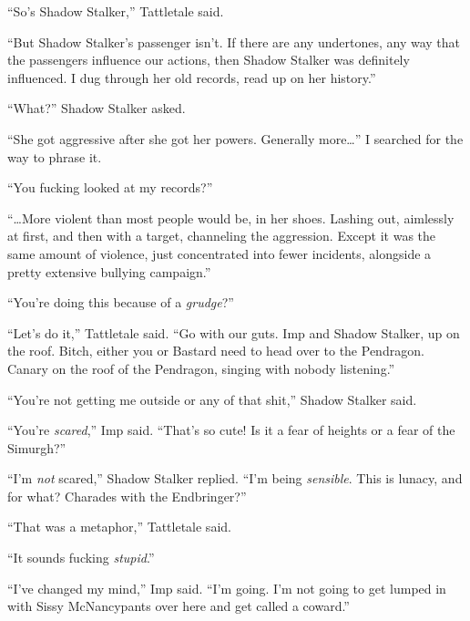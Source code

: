 ``So's Shadow Stalker,'' Tattletale said.



``But Shadow Stalker's passenger isn't.  If there are any undertones, any way that the passengers influence our actions, then Shadow Stalker was definitely influenced.  I dug through her old records, read up on her history.''



``What?'' Shadow Stalker asked.



``She got aggressive after she got her powers.  Generally more\ldots'' I searched for the way to phrase it.



``You fucking looked at my records?''



``\ldots{}More violent than most people would be, in her shoes.  Lashing out, aimlessly at first, and then with a target, channeling the aggression.  Except it was the same amount of violence, just concentrated into fewer incidents, alongside a pretty extensive bullying campaign.''



``You're doing this because of a \emph{grudge}?''



``Let's do it,'' Tattletale said.  ``Go with our guts.  Imp and Shadow Stalker, up on the roof.  Bitch, either you or Bastard need to head over to the Pendragon.  Canary on the roof of the Pendragon, singing with nobody listening.''



``You're not getting me outside or any of that shit,'' Shadow Stalker said.



``You're \emph{scared},'' Imp said.  ``That's so cute!  Is it a fear of heights or a fear of the Simurgh?''



``I'm \emph{not} scared,'' Shadow Stalker replied.  ``I'm being \emph{sensible}.  This is lunacy, and for what?  Charades with the Endbringer?''



``That was a metaphor,'' Tattletale said.



``It sounds fucking \emph{stupid}.''



``I've changed my mind,'' Imp said.  ``I'm going.  I'm not going to get lumped in with Sissy McNancypants over here and get called a coward.''



